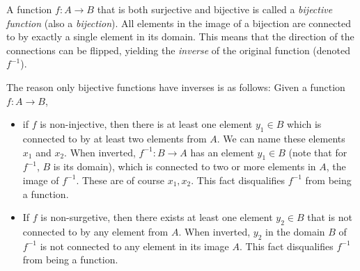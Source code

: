 A function $f:A\to B$ that is both surjective and bijective is called a \emph{bijective function} (also a \emph{bijection}). All elements in the image of a bijection are connected to by exactly a single element in its domain. This means that the direction of the connections can be flipped, yielding the \emph{inverse} of the original function (denoted $f^{-1}$).

The reason only bijective functions have inverses is as follows: Given a function $f:A\to B$,
\begin{itemize}
	\item if $f$ is non-injective, then there is at least one element $y_{1}\in B$ which is connected to by at least two elements from $A$. We can name these elements $x_{1}$ and $x_{2}$. When inverted, $f^{-1}:B\to A$ has an element $y_{1}\in B$ (note that for $f^{-1}$, $B$ is its domain), which is connected to two or more elements in $A$, the image of $f^{-1}$. These are of course $x_{1},x_{2}$. This fact disqualifies $f^{-1}$ from being a function.
	\item If $f$ is non-surgetive, then there exists at least one element $y_{2}\in B$ that is not connected to by any element from $A$. When inverted, $y_{2}$ in the domain $B$ of $f^{-1}$ is not connected to any element in its image $A$. This fact disqualifies $f^{-1}$ from being a function.
\end{itemize}

